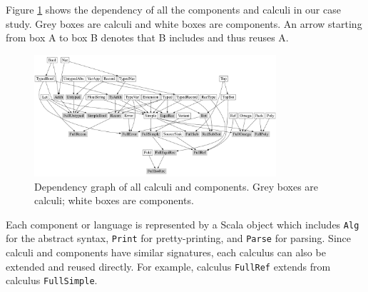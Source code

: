 
Figure \ref{fig:dependency} shows the
dependency of all the components and calculi in our case study. Grey
boxes are calculi and white boxes are components. An arrow starting
from box A to box B denotes that B includes and thus reuses A.

\begin{figure}
    \centering
    \includegraphics[width=0.8\textwidth]{resources/depGraph.pdf}
    \caption{Dependency graph of all calculi and components. Grey boxes are calculi; white boxes are components.}
    \label{fig:dependency}
\end{figure}

Each component or language is represented by a Scala object which includes \lstinline{Alg}
for the abstract syntax, \lstinline{Print} for pretty-printing, and \lstinline{Parse} for parsing.
Since calculi and components have similar signatures, each calculus
can also be extended and reused directly. For example, calculus \lstinline{FullRef} extends from
calculus \lstinline{FullSimple}.





